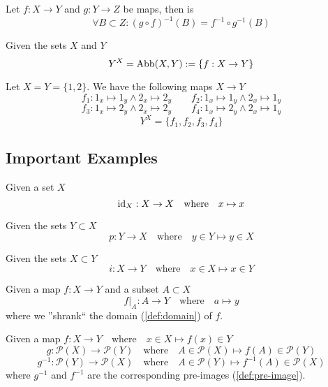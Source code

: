 \begin{proposition}
   Let \(f: X \to Y\) and \(g: Y \to Z\) be maps, then is
   \[\forall B \subset Z: (g \circ f)^{-1}(B) = f^{-1} \circ g^{-1}(B)\]
\end{proposition}

\begin{definition}
   Given the sets \(X\) and \(Y\)
   \[Y^X = \operatorname{Abb}(X, Y) := \{f: X \to Y\}\]
\end{definition}
\begin{example}
   Let \(X = Y = \{1, 2\}\).
   We have the following maps \(X \to Y\)
   \[f_1: 1_x \mapsto 1_y \land 2_x \mapsto 2_y \qquad f_2: 1_x \mapsto 1_y \land 2_x \mapsto 1_y\]
   \[f_3: 1_x \mapsto 2_y \land 2_x \mapsto 2_y \qquad f_4: 1_x \mapsto 2_y \land 2_x \mapsto 1_y\]
   \[Y^X = \{f_1, f_2, f_3, f_4\}\]
\end{example}

\subsection{Important Examples}
\begin{example}[Identity]
   Given a set \(X\)
   \[\operatorname{id}_X: X \to X \quad\text{where}\quad x \mapsto x\]
\end{example}

\begin{definition}[Projection]\label{def:projection}
   Given the sets \(Y \subset X\)
   \[p: Y \to X \quad\text{where}\quad y \in Y \mapsto y \in X\]
\end{definition}

\begin{definition}
   Given the sets \(X \subset Y\)
   \[i: X \to Y \quad\text{where}\quad x \in X \mapsto x \in Y\]
\end{definition}

\begin{example}
   Given a map \(f: X \to Y\) and a subset \(A \subset X\)
   \[f|_A: A \to Y \quad\text{where}\quad a \mapsto y\]
   where we ''shrank`` the domain (\ref{def:domain}) of \(f\).
\end{example}

\begin{example}
   Given a map \(f: X \to Y \quad\text{where}\quad x \in X \mapsto f(x) \in Y\)
   \[g: \mathcal{P}(X) \to \mathcal{P}(Y) \quad\text{where}\quad A \in \mathcal{P}(X) \mapsto f(A) \in \mathcal{P}(Y)\]
   \[g^{-1}: \mathcal{P}(Y) \to \mathcal{P}(X) \quad\text{where}\quad A \in \mathcal{P}(Y) \mapsto f^{-1}(A) \in \mathcal{P}(X)\]
   where \(g^{-1}\) and \(f^{-1}\) are the corresponding pre-images (\ref{def:pre-image}).
\end{example}

